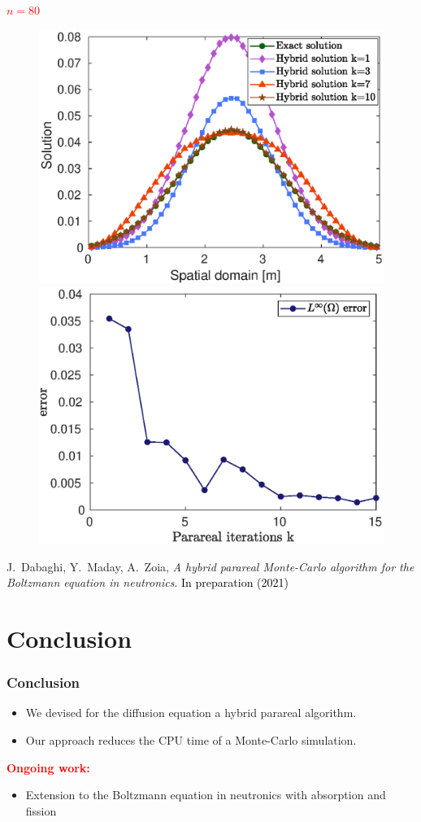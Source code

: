 \documentclass[aspectratio=169]{beamer}
\begin{document}
%
\begin{frame}
\begin{center}
  \textcolor{red}{$n=80$}
  \end{center}
\begin{figure}
    \centering
\includegraphics[width = 0.48 \textwidth]{image/image_Boltzmann/exact_vs_hybrid_n=80}
\quad
\includegraphics[width = 0.48 \textwidth]{image/image_Boltzmann/Linf_error_n=80}
\end{figure}
\begin{thebibliography}{10}
 \scriptsize{
 {\sc J.~Dabaghi, Y.~Maday, A.~Zoia, {\em A hybrid parareal Monte-Carlo algorithm for the Boltzmann equation in neutronics}.
 \textcolor{black}{In preparation (2021)}}}
 \end{thebibliography}
  \end{frame}

\section{Conclusion}
\begin{frame}
\frametitle{Conclusion}
\begin{itemize}
\item
We devised for the diffusion equation a hybrid parareal algorithm.
\vspace{0.3 cm}
\item Our approach reduces the CPU time of a Monte-Carlo simulation.
\end{itemize}
\vspace{0.5 cm}
\textcolor{red}{\textbf{Ongoing work:}}
\begin{itemize}
\item Extension to the Boltzmann equation in neutronics with absorption and fission
\end{itemize}
\vspace{0.5 cm}


\end{frame}
\end{document}
